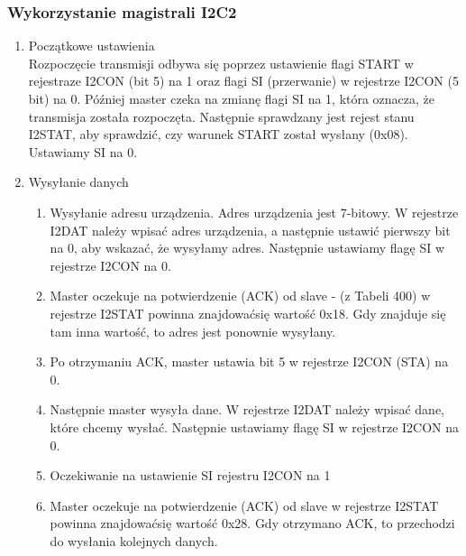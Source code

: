 \documentclass{article}
\begin{document}
\subsubsection{Wykorzystanie magistrali I2C2}
\begin{enumerate}
    \item Początkowe ustawienia\\
        Rozpoczęcie transmisji odbywa się poprzez ustawienie flagi START w rejestraze I2CON (bit 5) na 1 oraz flagi SI (przerwanie) w rejestrze I2CON (5 bit) na 0. Później master czeka na zmianę flagi SI na 1, która oznacza, że transmisja została rozpoczęta. Następnie sprawdzany jest rejest stanu I2STAT, aby sprawdzić, czy warunek START został wysłany (0x08). Ustawiamy SI na 0.
    \item Wysyłanie danych\\
    \begin{enumerate}
        \item Wysyłanie adresu urządzenia. Adres urządzenia jest 7-bitowy. W rejestrze I2DAT należy wpisać adres urządzenia, a następnie ustawić pierwszy bit na 0, aby wskazać, że wysyłamy adres. Następnie ustawiamy flagę SI w rejestrze I2CON na 0.
        \item Master oczekuje na potwierdzenie (ACK) od slave - (z Tabeli 400) w rejestrze I2STAT powinna znajdowaćsię wartość 0x18. Gdy znajduje się tam inna wartość, to adres jest ponownie wysyłany.
        \item Po otrzymaniu ACK, master ustawia bit 5 w rejestrze I2CON (STA) na 0.
        \item Następnie master wysyła dane. W rejestrze I2DAT należy wpisać dane, które chcemy wysłać. Następnie ustawiamy flagę SI w rejestrze I2CON na 0.
        \item Oczekiwanie na ustawienie SI rejestru I2CON na 1
        \item Master oczekuje na potwierdzenie (ACK) od slave w rejestrze I2STAT powinna znajdowaćsię wartość 0x28. Gdy otrzymano ACK, to przechodzi do wysłania kolejnych danych.
    \end{enumerate}
    

\end{enumerate}
\end{document}
